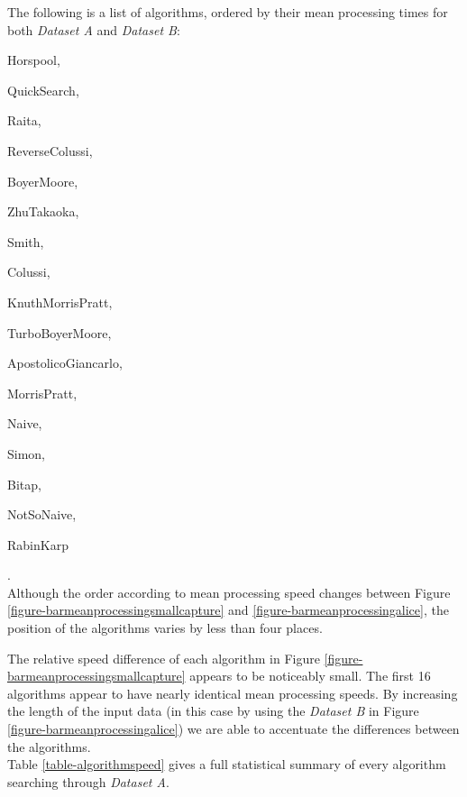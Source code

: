 \documentclass[11pt]{article}
\begin{document}
The following is a list of algorithms, ordered by their mean processing times for both \textit{Dataset A} and \textit{Dataset B}:
\begin{enumerate*}
    \item Horspool,
    \item QuickSearch,
    \item Raita,
    \item ReverseColussi,
    \item BoyerMoore,
    \item ZhuTakaoka,
    \item Smith,
    \item Colussi,
    \item KnuthMorrisPratt,
    \item TurboBoyerMoore,
    \item ApostolicoGiancarlo,
    \item MorrisPratt,
    \item Naive,
    \item Simon,
    \item Bitap,
    \item NotSoNaive,
    \item RabinKarp
\end{enumerate*}.\\ 

Although the order according to mean processing speed changes between Figure \ref{figure-barmeanprocessingsmallcapture} and \ref{figure-barmeanprocessingalice}, the position of the algorithms varies by less than four places.

The relative speed difference of each algorithm in Figure \ref{figure-barmeanprocessingsmallcapture} appears to be noticeably small. The first 16 algorithms appear to have nearly identical mean processing speeds. By increasing the length of the input data (in this case by using the \textit{Dataset B} in Figure \ref{figure-barmeanprocessingalice}) we are able to accentuate the differences between the algorithms. \\
Table \ref{table-algorithmspeed} gives a full statistical summary of every algorithm searching through \textit{Dataset A}.\\
\end{document}
